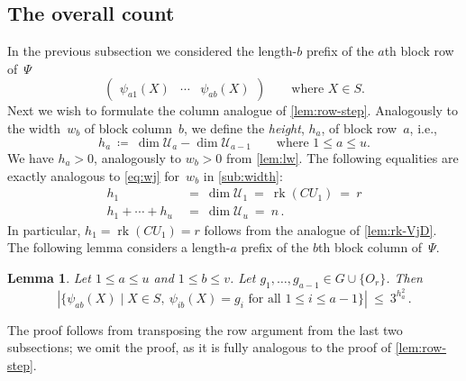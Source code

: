 \documentclass{lmcs}
\newtheorem{lemma}[thm]{Lemma}
\theoremstyle{definition}
\newcommand{\rk}{\operatorname{rk}}
\newcommand{\U}{\mathcal{U}}
\begin{document}
\subsection{The overall count} \label{sub:overall}

In the previous subsection we considered the length-$b$ prefix of the $a$th block row of~$\Psi$
\[
\begin{pmatrix} \psi_{a 1}(X) & \cdots & \psi_{a b}(X) \end{pmatrix} \qquad \text{where $X \in S$.}
\]
Next we wish to formulate the column analogue of \cref{lem:row-step}.
Analogously to the width~$w_b$ of block column~$b$, we define the \emph{height}, $h_a$, of block row~$a$, i.e.,
\[
 h_a \ \coloneqq \ \dim \U_a - \dim \U_{a-1} \qquad \text{where $1 \le a \le u$.}
\]
We have $h_a > 0$, analogously to $w_b > 0$ from \cref{lem:lw}.
The following equalities are exactly analogous to \cref{eq:wj} for~$w_b$ in \cref{sub:width}:
\begin{equation} \label{eq:hi} \begin{aligned}
 h_1 \ &= \ \dim \U_1 \ = \ \rk(C U_1) \ = \ r    \\
 h_1 + \cdots + h_u \ &= \ \dim \U_u \ = \ n \,.
\end{aligned}
\end{equation}
In particular, $h_1 = \rk(C U_1) = r$ follows from the analogue of \cref{lem:rk-VjD}.
The following lemma considers a length-$a$ prefix of the $b$th block column of~$\Psi$.
\begin{lemma}\label{lem:column-step}
Let $1 \le a \le u$ and $1 \le b \le v$.
Let $g_1, \ldots, g_{a-1} \in G \cup \{O_r\}$.
Then
\[
 |\{\psi_{a b}(X) \mid X \in S, \ \psi_{i b}(X) = g_i \text{ for all } 1 \le i \le a-1\}| \ \le \ 3^{h_a^2}\,.
\]
\end{lemma}
The proof follows from transposing the row argument from the last two subsections; we omit the proof, as it is fully analogous to the proof of \cref{lem:row-step}.
\end{document}
